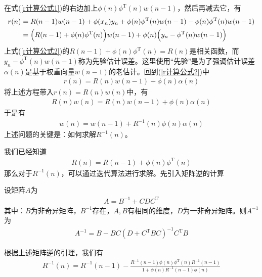{            在式(\ref{r计算公式1})的右边加上$\phi(n)\phi^\mathrm{T}(n)w(n-1)$，然后再减去它，有
            \begin{align}
            \label{r计算公式2}
            r(n) & = R(n-1)w(n-1)+ \phi(x_n)y_n + \phi(n)\phi^\mathrm{T}(n)w(n-1) - \phi(n)\phi^\mathrm{T}(n)w(n-1)\notag\\
            & = \Bigl( R(n-1)+\phi(n)\phi^\mathrm{T}(n) \Bigr) w(n-1)+\phi(n) \Bigl( y_n-\phi^\mathrm{T}(n)w(n-1) \Bigr)
            \end{align}
            上式(\ref{r计算公式2})的$R(n-1)+\phi(n)\phi^\mathrm{T}(n) = R(n)$是相关函数，而$y_n-\phi^\mathrm{T}(n)w(n-1)$称为先验估计误差。这里使用“先验”是为了强调估计误差$\alpha(n)$是基于权重向量$w(n-1)$的老估计。回到(\ref{r计算公式2})中
            \begin{align*}
            r(n) = R(n)w(n-1) + \phi(n)\alpha(n)
            \end{align*}
            将上述方程带入$r(n) = R(n)w(n)$中，有
            \begin{align*}
            R(n)w(n) = R(n)w(n-1)+\phi(n)\alpha(n)
            \end{align*}
            于是有
            \begin{align*}
            w(n) = w(n-1) + R^{-1}(n) \phi(n)\alpha(n)
            \end{align*}
            上述问题的关键是：如何求解$R^{-1}(n)$。
            \par
            我们已经知道
            \begin{align*}
            R(n) = R(n-1)+\phi(n)\phi^\mathrm{T}(n)
            \end{align*}
            那么对于$R^{-1}(n)$，可以通过迭代算法进行求解。先引入矩阵逆的计算
            \begin{lemma}[矩阵逆的计算]
            设矩阵$A$为
            \begin{align*}
            A = B^{-1}+ CDC^{\mathrm{T}}
            \end{align*}
            其中：$B$为非奇异矩阵，$B^{-1}$存在，$A,B$有相同的维度，$D$为一非奇异矩阵。则$A^{-1}$为
            \begin{align*}
            A^{-1} = B-BC(D+C^\mathrm{T}BC)^{-1}C^\mathrm{T}B
            \end{align*}
            \end{lemma}
            \par
            根据上述矩阵逆的引理，我们有
            \begin{align*}
            R^{-1}(n) = R^{-1}(n-1) - \frac{R^{-1}(n-1)\phi(n)\phi^\mathrm{T}(n)R^{-1}(n-1)}{1+\phi(n)R^{-1}(n-1)\phi(n)}

\end{align*}}
